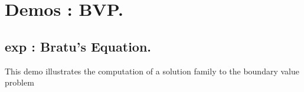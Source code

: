 \documentclass[12pt]{report}
\begin{document}
\chapter{ \AUTO Demos : BVP.} \label{ch:Demos_BVP}

\section{ exp : Bratu's Equation.} \label{sec:Demos_exp}
This demo illustrates the computation of a solution family to
the boundary value problem
\end{document}
